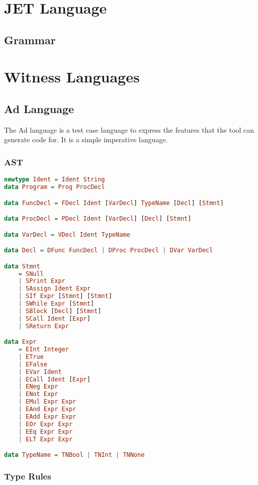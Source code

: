 \appendix

\chapter{JET Language}
\label{appendix:jetLanguage}
\section{Grammar}

\chapter{Witness Languages}
\label{appendix:witnessLanguages}
\section{Ad Language}
The Ad language is a test case language to express the features that the tool can generate code for.
It is a simple imperative language.
\subsection{AST}
\begin{lstlisting}[language=Haskell]
newtype Ident = Ident String
data Program = Prog ProcDecl

data FuncDecl = FDecl Ident [VarDecl] TypeName [Decl] [Stmnt]

data ProcDecl = PDecl Ident [VarDecl] [Decl] [Stmnt]

data VarDecl = VDecl Ident TypeName

data Decl = DFunc FuncDecl | DProc ProcDecl | DVar VarDecl

data Stmnt
    = SNull
    | SPrint Expr
    | SAssign Ident Expr
    | SIf Expr [Stmnt] [Stmnt]
    | SWhile Expr [Stmnt]
    | SBlock [Decl] [Stmnt]
    | SCall Ident [Expr]
    | SReturn Expr

data Expr
    = EInt Integer
    | ETrue
    | EFalse
    | EVar Ident
    | ECall Ident [Expr]
    | ENeg Expr
    | ENot Expr
    | EMul Expr Expr
    | EAnd Expr Expr
    | EAdd Expr Expr
    | EOr Expr Expr
    | EEq Expr Expr
    | ELT Expr Expr

data TypeName = TNBool | TNInt | TNNone
\end{lstlisting}

\subsection{Type Rules}
